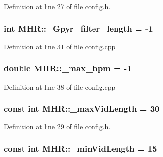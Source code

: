 Definition at line 27 of file config.\+h.

\hypertarget{namespace_m_h_r_ac3927bf3a2b93c8dc4ef19ee1a3d55f8}{
\subsubsection[{\+\_\+\+Gpyr\+\_\+filter\+\_\+length}]{\setlength{\rightskip}{0pt plus 5cm}int M\+H\+R\+::\+\_\+\+Gpyr\+\_\+filter\+\_\+length = -\/1}}\label{namespace_m_h_r_ac3927bf3a2b93c8dc4ef19ee1a3d55f8}


Definition at line 31 of file config.\+cpp.

\hypertarget{namespace_m_h_r_a1a13273dd519ccfaf4dc1800bd2031d2}{
\subsubsection[{\+\_\+max\+\_\+bpm}]{\setlength{\rightskip}{0pt plus 5cm}double M\+H\+R\+::\+\_\+max\+\_\+bpm = -\/1}}\label{namespace_m_h_r_a1a13273dd519ccfaf4dc1800bd2031d2}


Definition at line 38 of file config.\+cpp.

\hypertarget{namespace_m_h_r_a0a7cdb59c1f1e8af6e6b61543c81724d}{
\subsubsection[{\+\_\+max\+Vid\+Length}]{\setlength{\rightskip}{0pt plus 5cm}const int M\+H\+R\+::\+\_\+max\+Vid\+Length = 30}}\label{namespace_m_h_r_a0a7cdb59c1f1e8af6e6b61543c81724d}


Definition at line 29 of file config.\+h.

\hypertarget{namespace_m_h_r_aced573ebf5ae641d5c3a58c9762462fb}{
\subsubsection[{\+\_\+min\+Vid\+Length}]{\setlength{\rightskip}{0pt plus 5cm}const int M\+H\+R\+::\+\_\+min\+Vid\+Length = 15}}\label{namespace_m_h_r_aced573ebf5ae641d5c3a58c9762462fb}


